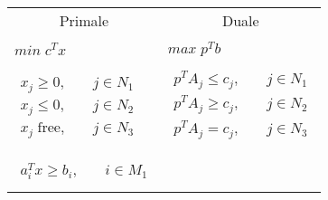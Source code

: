 \documentclass{article}
\begin{document}
\begin{preview}
\begin{center}
                        \paragraph{}
                        \begin{tabular}{l l}
                                \multicolumn{1}{c}{ Primale } & \multicolumn{1}{c}{ Duale } \\
                                \cline{1-2}
                                \\
                                $ min \; c^{T}x $ & $ max \; p^{T}b $ \\
                                \\
                                \begin{math}
                                        \begin{aligned}
                                                x_j \geq{0}, \quad & j \in N_1 \\
                                                x_j \leq{0}, \quad & j \in N_2 \\
                                                x_j \; \text{free}, \quad & j \in N_3
                                        \end{aligned}
                                \end{math} &
                                        \begin{math}
                                                \begin{aligned}
                                                        p^{T}A_j \leq{c_j}, \quad & j \in N_1 \\
                                                        p^{T}A_j \geq{c_j}, \quad & j \in N_2 \\
                                                        p^{T}A_j = c_j, \quad & j \in N_3 \\
                                                \end{aligned}
                                        \end{math} \\
                                \multicolumn{1}{c}{} \\
                                \begin{math}
                                        \begin{aligned}
                                                a^{T}_{i}x \geq{b_i}, \quad & i \in M_1 \\

\end{aligned}
\end{math}
\end{tabular}
\end{center}
\end{preview}
\end{document}
